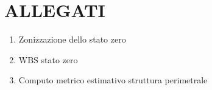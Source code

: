 \chapter{ALLEGATI}
\begin{enumerate}
\item Zonizzazione dello stato zero
    \item WBS stato zero
    \item Computo metrico estimativo struttura perimetrale
\end{enumerate}
\label{Edificio}


\label{WBS}

\label{STRUTcostoMateriale}
